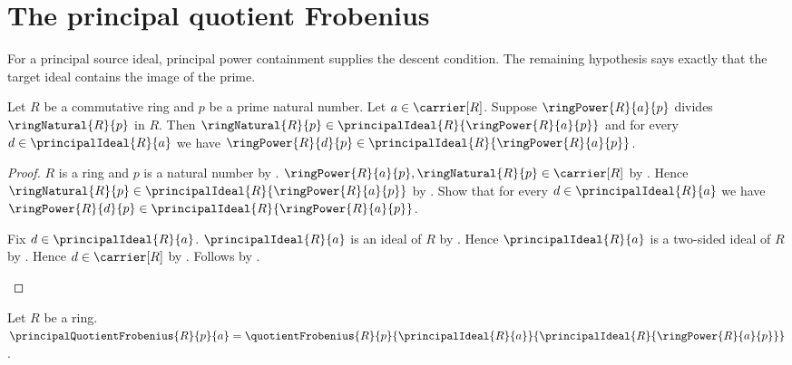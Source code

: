 \section{The principal quotient Frobenius}

For a principal source ideal, principal power containment supplies the
descent condition.  The remaining hypothesis says exactly that the target
ideal contains the image of the prime.

\begin{theorem}\label{principal_frobenius_compatibility}
    Let $R$ be a commutative ring and $p$ be a prime natural number.
    Let $a\in\carrier[R]$.
    Suppose $\ringPower{R}{a}{p}$ divides $\ringNatural{R}{p}$ in $R$.
    Then
        $\ringNatural{R}{p}
            \in\principalIdeal{R}{\ringPower{R}{a}{p}}$ and
        for every $d\in\principalIdeal{R}{a}$ we have
            $\ringPower{R}{d}{p}
                \in\principalIdeal{R}{\ringPower{R}{a}{p}}$.
\end{theorem}
\begin{proof}
    $R$ is a ring and $p$ is a natural number by
        .
    $\ringPower{R}{a}{p},\ringNatural{R}{p}\in\carrier[R]$ by
        .
    Hence
        $\ringNatural{R}{p}
            \in\principalIdeal{R}{\ringPower{R}{a}{p}}$ by
        .
    Show that for every $d\in\principalIdeal{R}{a}$ we have
        $\ringPower{R}{d}{p}
            \in\principalIdeal{R}{\ringPower{R}{a}{p}}$.
    \begin{subproof}
        Fix $d\in\principalIdeal{R}{a}$.
        $\principalIdeal{R}{a}$ is an ideal of $R$ by
            .
        Hence $\principalIdeal{R}{a}$ is a two-sided ideal of $R$ by
            .
        Hence $d\in\carrier[R]$ by
            .
        Follows by .
    \end{subproof}
\end{proof}

\begin{definition}\label{principal_quotient_frobenius}
    Let $R$ be a ring.
    $\principalQuotientFrobenius{R}{p}{a}=
        \quotientFrobenius{R}{p}{\principalIdeal{R}{a}}{
            \principalIdeal{R}{\ringPower{R}{a}{p}}}$.
\end{definition}

